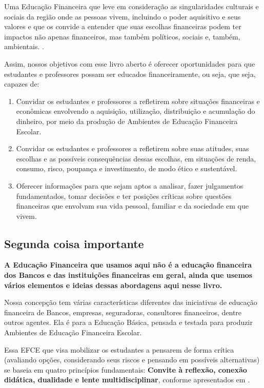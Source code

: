 \begin{apresentacao}
Uma Educação Financeira que leve em consideração as singularidades culturais e sociais da região onde as pessoas vivem, incluindo o poder aquisitivo e seus valores e que os convide a entender que suas escolhas financeiras podem ter impactos não apenas financeiros, mas também políticos, sociais e, também, ambientais. \citep{muniz2016a}.


Assim, nossos objetivos com esse livro aberto é oferecer oportunidades para que estudantes e professores possam ser educados financeiramente, ou seja, que seja, capazes de:

\begin{enumerate}[label=\arabic* --, leftmargin=0pt]
  \item Convidar os estudantes e professores a refletirem sobre situações financeiras e econômicas envolvendo a aquisição, utilização, distribuição e acumulação do dinheiro, por meio da produção de Ambientes de Educação Financeira Escolar.

  \item Convidar os estudantes e professores a refletirem sobre suas atitudes, suas escolhas e as possíveis consequências dessas escolhas, em situações de renda, consumo, risco, poupança e investimento, de modo ético e sustentável. 

  \item Oferecer informações para que sejam aptos a analisar, fazer julgamentos fundamentados, tomar decisões e ter posições críticas sobre questões financeiras que envolvam sua vida pessoal, familiar e da sociedade em que vivem.
\end{enumerate}

\subsection{Segunda coisa importante} 
\begin{center}
\textbf{A Educação Financeira que usamos aqui não é a educação financeira dos Bancos e das instituições financeiras em geral, ainda que usemos vários elementos e ideias dessas abordagens aqui nesse livro.}
\end{center}

Nossa concepção tem várias características diferentes das iniciativas de educação financeira de Bancos, empresas, seguradoras, consultores financeiros, dentre outros agentes. Ela é para a Educação Básica, pensada e testada para produzir Ambientes de Educação Financeira Escolar. 

Essa EFCE que visa mobilizar os estudantes a pensarem de forma crítica (avaliando opções, considerando seus riscos e pensando em possíveis alternativas) se baseia em quatro princípios fundamentais: \textbf{Convite à reflexão, conexão didática, dualidade e lente multidisciplinar}, conforme apresentados em \cite{muniz2016b}.


\end{apresentacao}
